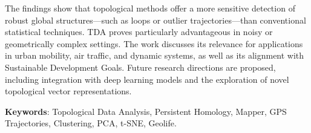 The findings show that topological methods offer a more sensitive detection of robust global structures—such as loops or outlier trajectories—than conventional statistical techniques. TDA proves particularly advantageous in noisy or geometrically complex settings. The work discusses its relevance for applications in urban mobility, air traffic, and dynamic systems, as well as its alignment with Sustainable Development Goals. Future research directions are proposed, including integration with deep learning models and the exploration of novel topological vector representations.

\textbf{Keywords}: Topological Data Analysis, Persistent Homology, Mapper, GPS Trajectories, Clustering, PCA, t-SNE, Geolife.
